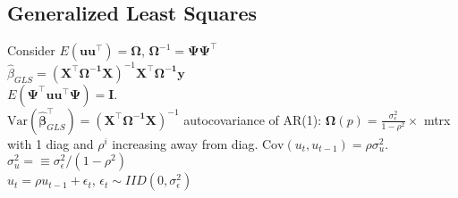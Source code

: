 \subsection*{Generalized Least Squares}
Consider $E(\mathbf{uu^{\top}}) = \mathbf{\Omega}$, $\mathbf{\Omega}^{-1} = \mathbf{\Psi \Psi^{\top}}$\\
$\hat{\beta}_{GLS} = (\mathbf{X^{\top} \Omega^{-1} X})^{-1} \mathbf{X^{\top} \Omega^{-1} y}$\\
$E(\mathbf{\Psi^{\top} uu^{\top} \Psi}) = \mathbf{I}$.\\
$\text{Var}(\hat{\mathbf{\beta}}^{\top}_{GLS}) = (\mathbf{X^{\top} \Omega^{-1}X})^{-1}$
autocovariance of AR(1): $\mathbf{\Omega}(p) = \frac{\sigma_{\epsilon}^2}{1-\rho^2} \times$ mtrx with 1 diag and $\rho^i$ increasing away from diag.
$\text{Cov}(u_t, u_{t-1}) = \rho \sigma_u ^2$.\\
$\sigma_u ^2 = \equiv \sigma_{\epsilon}^2 / (1-\rho^2)$\\
$u_t = \rho u_{t-1} + \epsilon_t$, $\epsilon_t \sim IID(0, \sigma_{\epsilon}^2)$

